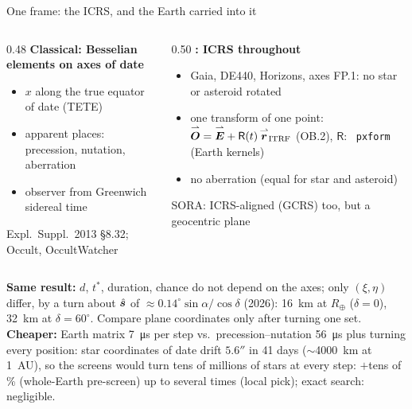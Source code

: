 \begin{frame}{One frame: the ICRS, and the Earth carried into it}
  \scriptsize
  \begin{columns}[T]
    \begin{column}{0.48\textwidth}
      \textbf{Classical: Besselian elements on axes of date}
      \begin{itemize}\setlength{\itemsep}{0pt}
        \item $x$ along the \alert{true equator of date} (TETE)
        \item apparent places: precession, nutation, aberration
        \item observer from Greenwich sidereal time
      \end{itemize}
      {\tiny Expl.\ Suppl.\ 2013 \S8.32; Occult, OccultWatcher}
    \end{column}
    \begin{column}{0.50\textwidth}
      \textbf{\OWN: ICRS throughout}
      \begin{itemize}\setlength{\itemsep}{0pt}
        \item Gaia, DE440, Horizons, axes FP.1: \alert{no star or asteroid rotated}
        \item \alert{one} transform of \alert{one} point: $\overset{\rightharpoonup}{\bm{O}} = \overset{\rightharpoonup}{\bm{E}} + \mathsf{R}(t)\,\overset{\rightharpoonup}{\bm{r}}_{\mathrm{ITRF}}$ (OB.2), $\mathsf{R}$: \SP\ \texttt{pxform} (Earth kernels)
        \item no aberration (equal for star and asteroid)
      \end{itemize}
      {\tiny SORA: ICRS-aligned (GCRS) too, but a geocentric plane}
    \end{column}
  \end{columns}
  \vspace{0.8ex}
  \textbf{Same result:} $d$, $t^*$, duration, chance do not depend on the axes; only $(\xi,\eta)$ differ, by a turn about
  $\hat{\bm{s}}$ of $\approx 0.14^\circ\sin\alpha/\cos\delta$ (2026): \SI{16}{km} at $R_\oplus$ ($\delta = 0$),
  \SI{32}{km} at $\delta = 60^\circ$. \alert{Compare plane coordinates only after turning one set.}\\[0.8ex]
  \textbf{Cheaper:} Earth matrix \SI{7}{\micro s} per step vs.\ precession--nutation \SI{56}{\micro s} plus turning every
  position: star coordinates of date drift $5.6''$ in 41 days ($\sim$\SI{4000}{km} at \SI{1}{AU}), so the screens would
  turn tens of millions of stars at every step: $+$tens of \% (whole-Earth pre-screen) up to several times (local pick);
  exact search: negligible.
\end{frame}

